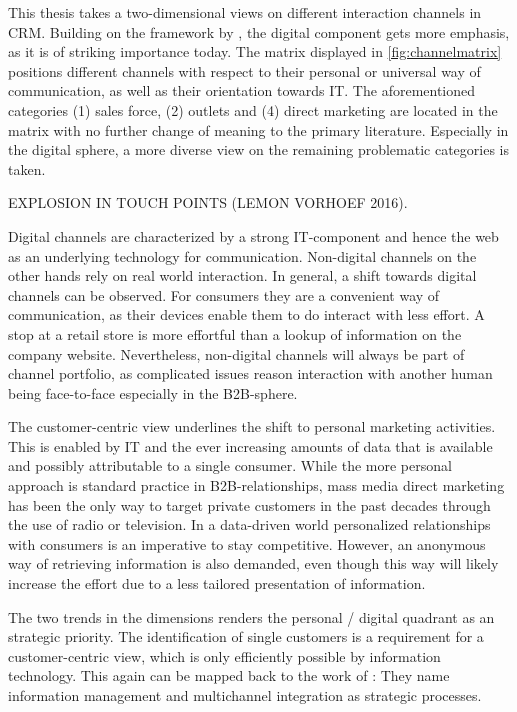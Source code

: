 		This thesis takes a two-dimensional views on different interaction channels in CRM. Building on the framework by \citeauthor{paynefrow2005}, the digital component gets more emphasis, as it is of striking importance today. The matrix displayed in \ref{fig:channelmatrix} positions different channels with respect to their personal or universal way of communication, as well as their orientation towards IT. The aforementioned categories (1) sales force, (2) outlets and (4) direct marketing are located in the matrix with no further change of meaning to the primary literature. Especially in the digital sphere, a more diverse view on the remaining problematic categories is taken.
		
		
		EXPLOSION IN TOUCH POINTS (LEMON VORHOEF 2016).
		
		Digital channels are characterized by a strong IT-component and hence the web as an underlying technology for communication. Non-digital channels on the other hands rely on real world interaction. In general, a shift towards digital channels can be observed. For consumers they are a convenient way of communication, as their devices enable them to do interact with less effort. A stop at a retail store is more effortful than a lookup of information on the company website. Nevertheless, non-digital channels will always be part of channel portfolio, as complicated issues reason interaction with another human being face-to-face especially in the B2B-sphere. 
		
		The customer-centric view underlines the shift to personal marketing activities. This is enabled by IT and the ever increasing amounts of data that is available and possibly attributable to a single consumer. While the more personal approach is standard practice in B2B-relationships, mass media direct marketing has been the only way to target private customers in the past decades through the use of radio or television. In a data-driven world personalized relationships with consumers is an imperative to stay competitive. However, an anonymous way of retrieving information is also demanded, even though this way will likely increase the effort due to a less tailored presentation of information. 
		
		The two trends in the dimensions renders the personal / digital quadrant as an strategic priority.
		The identification of single customers is a requirement for a customer-centric view, which is only efficiently possible by information technology.  
		This again can be mapped back to the work of \citeauthor{paynefrow2005}: They name information management and multichannel integration as strategic processes. 
		
